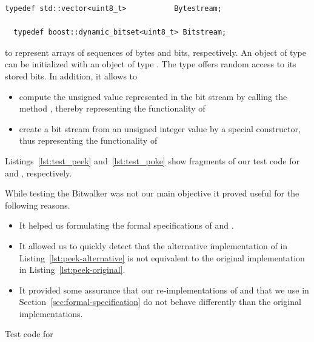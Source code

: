 \begin{lstlisting}[style = acsl-block]
  typedef std::vector<uint8_t>           Bytestream;

  typedef boost::dynamic_bitset<uint8_t> Bitstream;
\end{lstlisting}

to represent arrays of sequences of bytes and bits, respectively.
An object of type  can be initialized with an object
of type . The type  offers random access
to its stored bits.
In addition, it allows to
\begin{itemize}
\item  compute the unsigned value represented in the bit stream by calling the
       method , thereby representing the functionality of \peek
\item  create a bit stream from an unsigned integer value by a special constructor,
       thus representing the functionality of \poke
\end{itemize}

Listings~\ref{lst:test_peek} and~\ref{lst:test_poke} show fragments of our test code
for \peek and \poke, respectively.

While testing the Bitwalker was not our main objective it proved useful for
the following reasons.

\begin{itemize}
\item It helped us formulating the formal specifications of \peek and \poke.
  
\item It allowed us to quickly detect that the alternative implementation of
      \peek in Listing~\ref{lst:peek-alternative} is not equivalent to the
      original implementation in Listing~\ref{lst:peek-original}.

\item It provided some assurance that our re-implementations of \peek and \poke
      that we use in Section~\ref{sec:formal-specification} do not behave differently
      than the original implementations.
\end{itemize}

\clearpage

\begin{listing}[hbt]
\begin{minipage}{\textwidth}

\end{minipage}
\caption{\label{lst:test_peek} Test code for \peek}
\end{listing}


